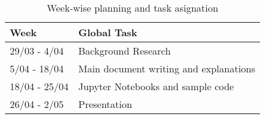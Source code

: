 \begin{table}[ht!]
\centering
\begin{tabular}{|l|l|}
\hline
Week          & Global Task                            \\ \hline
\hline 
29/03 - 4/04  & Background Research                    \\ \hline
5/04 - 18/04  & Main document writing and explanations \\ \hline
18/04 - 25/04 & Jupyter Notebooks and sample code      \\ \hline
26/04 - 2/05  & Presentation                           \\ \hline
\end{tabular}
\caption{Week-wise planning and task asignation}
\label{week-planning}
\end{table}

\begin{table}[ht!]
\centering
{}
    \caption{Diary: Previous Knowkledge}
    \label{previous-knowledge}
\end{table}

